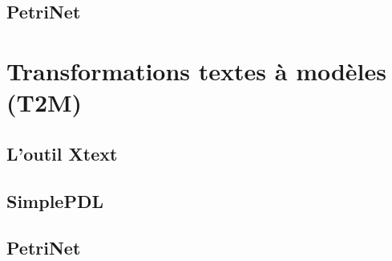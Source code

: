 \documentclass{rapport_gls}
\begin{document}
\section{PetriNet}
%

\chapter{Transformations textes à modèles (T2M)}
%
\section{L'outil Xtext}
%
\section{SimplePDL}
%
\section{PetriNet}
%
\end{document}
